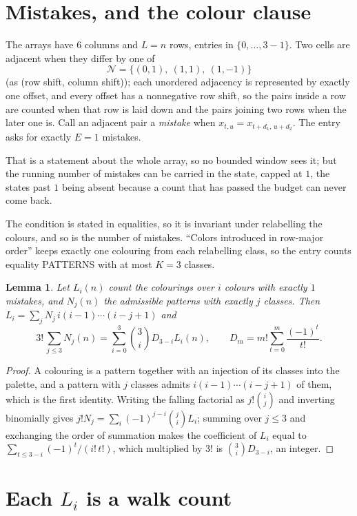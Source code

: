\documentclass[11pt,a4paper]{article}
\theoremstyle{plain}
\newtheorem{lemma}[theorem]{Lemma}
\theoremstyle{definition}
\begin{document}
\section{Mistakes, and the colour clause}

The arrays have $6$ columns and $L=n$ rows, entries in $\{0,\dots,3-1\}$.
Two cells are adjacent when they differ by one of
\[
\mathcal N=\{(0,1),\ (1,1),\ (1,-1)\}
\]
(as (row shift, column shift)); each unordered adjacency is represented by exactly one
offset, and every offset has a nonnegative row shift, so the pairs inside a row are
counted when that row is laid down and the pairs joining two rows when the later one
is. Call an adjacent pair a \emph{mistake} when $x_{t,u}=x_{t+d_1,\,u+d_2}$. The entry asks for exactly
$E=1$ mistakes.

That is a statement about the whole array, so no bounded window sees it; but the running
number of mistakes can be carried in the state, capped at $1$, the states past $1$ being
absent because a count that has passed the budget can never come back.

The condition is stated in equalities, so it is invariant under relabelling the colours, and
so is the number of mistakes. ``Colors introduced in row-major order'' keeps exactly one
colouring from each relabelling class, so the entry counts equality PATTERNS with at most
$K=3$ classes.

\begin{lemma}\label{lem:inv}
Let $L_i(n)$ count the colourings over $i$ colours with exactly $1$ mistakes, and $N_j(n)$
the admissible patterns with exactly $j$ classes. Then
$L_i=\sum_j N_j\,i(i-1)\cdots(i-j+1)$ and
\[
3!\,\sum_{j\le3}N_j(n)=\sum_{i=0}^{3}\binom{3}{i}D_{3-i}L_i(n),
\qquad D_m=m!\sum_{t=0}^{m}\frac{(-1)^t}{t!} .
\]
\end{lemma}

\begin{proof}
A colouring is a pattern together with an injection of its classes into the palette, and a
pattern with $j$ classes admits $i(i-1)\cdots(i-j+1)$ of them, which is the first identity.
Writing the falling factorial as $j!\binom{i}{j}$ and inverting binomially gives
$j!N_j=\sum_i(-1)^{j-i}\binom{j}{i}L_i$; summing over $j\le3$ and exchanging the order
of summation makes the coefficient of $L_i$ equal to $\sum_{t\le3-i}(-1)^t/(i!\,t!)$,
which multiplied by $3!$ is $\binom{3}{i}D_{3-i}$, an integer.
\end{proof}

\section{Each $L_i$ is a walk count}
\end{document}

